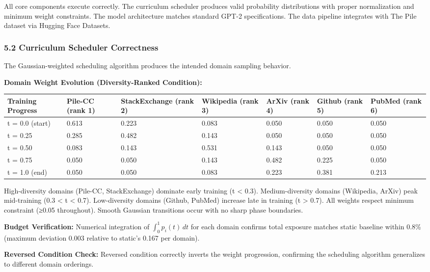 All core components execute correctly. The curriculum scheduler produces valid probability distributions with proper normalization and minimum weight constraints. The model architecture matches standard GPT-2 specifications. The data pipeline integrates with The Pile dataset via Hugging Face Datasets.

\subsubsection{5.2 Curriculum Scheduler Correctness}

The Gaussian-weighted scheduling algorithm produces the intended domain sampling behavior.

\textbf{Domain Weight Evolution (Diversity-Ranked Condition):}

\begin{table}[htbp]
\centering
\begin{tabular}{lllllll}
\toprule
Training Progress & Pile-CC (rank 1) & StackExchange (rank 2) & Wikipedia (rank 3) & ArXiv (rank 4) & Github (rank 5) & PubMed (rank 6) \\
\midrule
t = 0.0 (start) & 0.613 & 0.223 & 0.083 & 0.050 & 0.050 & 0.050 \\
t = 0.25 & 0.285 & 0.482 & 0.143 & 0.050 & 0.050 & 0.050 \\
t = 0.50 & 0.083 & 0.143 & 0.531 & 0.143 & 0.050 & 0.050 \\
t = 0.75 & 0.050 & 0.050 & 0.143 & 0.482 & 0.225 & 0.050 \\
t = 1.0 (end) & 0.050 & 0.050 & 0.083 & 0.223 & 0.381 & 0.213 \\
\bottomrule
\end{tabular}
\end{table}

High-diversity domains (Pile-CC, StackExchange) dominate early training (t < 0.3). Medium-diversity domains (Wikipedia, ArXiv) peak mid-training (0.3 < t < 0.7). Low-diversity domains (Github, PubMed) increase late in training (t > 0.7). All weights respect minimum constraint (≥0.05 throughout). Smooth Gaussian transitions occur with no sharp phase boundaries.

\textbf{Budget Verification:} Numerical integration of $\int_0^1 p_i(t) \, dt$ for each domain confirms total exposure matches static baseline within 0.8\% (maximum deviation 0.003 relative to static's 0.167 per domain).

\textbf{Reversed Condition Check:} Reversed condition correctly inverts the weight progression, confirming the scheduling algorithm generalizes to different domain orderings.

